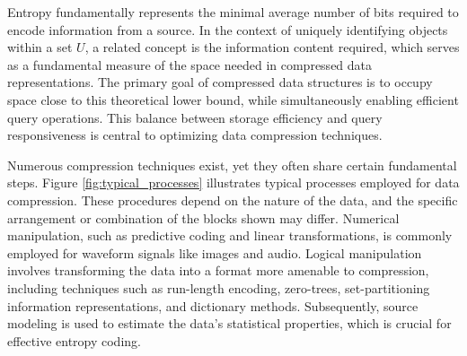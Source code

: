 Entropy fundamentally represents the minimal average number of bits required to encode information from a source. In the context of uniquely identifying objects within a set $U$, a related concept is the information content required, which serves as a fundamental measure of the space needed in compressed data representations. The primary goal of compressed data structures is to occupy space close to this theoretical lower bound, while simultaneously enabling efficient query operations. This balance between storage efficiency and query responsiveness is central to optimizing data compression techniques.

\noindent Numerous compression techniques exist, yet they often share certain fundamental steps. Figure \ref{fig:typical_processes} illustrates typical processes employed for data compression. These procedures depend on the nature of the data, and the specific arrangement or combination of the blocks shown may differ. Numerical manipulation, such as predictive coding and linear transformations, is commonly employed for waveform signals like images and audio. Logical manipulation involves transforming the data into a format more amenable to compression, including techniques such as run-length encoding, zero-trees, set-partitioning information representations, and dictionary methods. Subsequently, source modeling is used to estimate the data's statistical properties, which is crucial for effective entropy coding.

